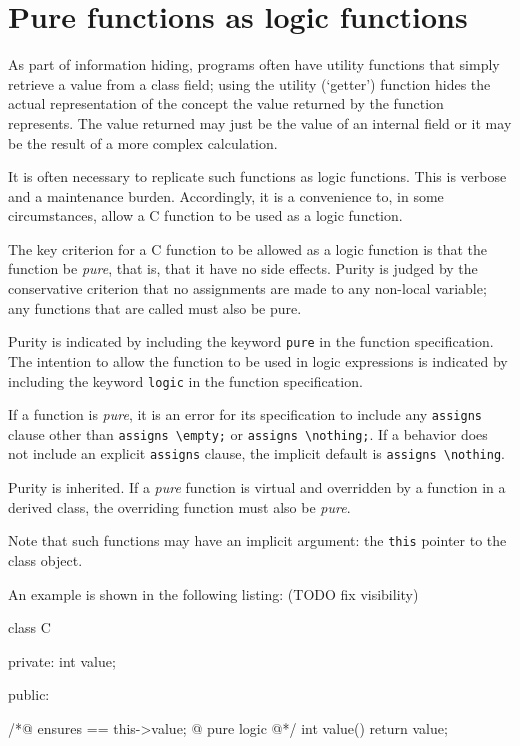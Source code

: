 \section{Pure functions as logic functions}
As part of information hiding, programs often have utility functions that simply retrieve a value from a class field;
using the utility (`getter') function hides the actual representation of the concept the value returned by the function represents. 
The value returned may just be the value of an internal field or it may be the result of a more complex calculation.

It is often necessary to replicate such functions as logic functions. 
This is verbose and a maintenance burden. 
Accordingly, it is a convenience to, in some circumstances, 
allow a C function to be used as a logic function.

The key criterion for a C function to be allowed as a logic function is that the function be \textit{pure}, that is, that it have no side effects. 
Purity is judged by the conservative criterion that no assignments are made to any non-local variable; any functions that are called must also be pure.

Purity is indicated by including the keyword \lstinline|pure| in the function specification.
The intention to allow the function to be used in logic expressions is indicated by including the keyword \lstinline|logic| in the function specification.

If a function is \textit{pure}, it is an error for its specification to include any \lstinline|assigns| clause other than \lstinline|assigns \empty;| or \lstinline|assigns \nothing;|. 
If a behavior does not include an explicit \lstinline|assigns| clause, the implicit default is \lstinline|assigns \nothing|.

Purity is inherited. 
If a \textit{pure} function is virtual and overridden by a function in a derived class, the overriding function must also be \textit{pure}.

Note that such functions may have an implicit argument: the 
\lstinline|this| pointer to the class object.

An example is shown in the following listing: (TODO fix visibility)

\begin{listing-nonumber}
class C {
  private:
    int value;
        
  public:
    
    /*@ ensures \result == this->value;
      @ pure logic
      @*/
    int value() {
    	return value;
    }

}
\end{listing-nonumber}


